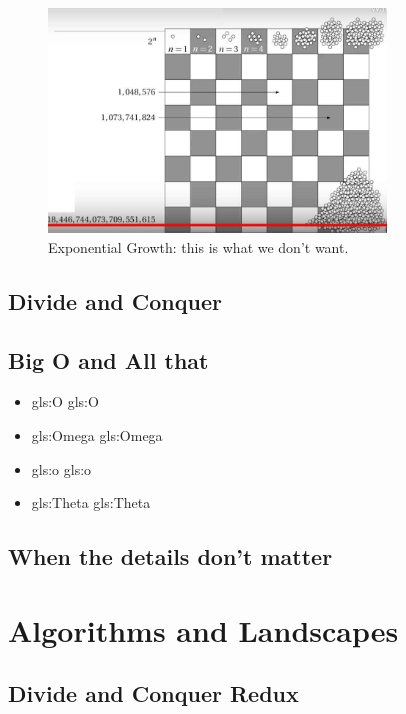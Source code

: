 \documentclass[]{article}
\begin{document}
\begin{figure}[H]
	\begin{center}
		\caption{Exponential Growth: this is what we don't want.}\label{fig:exponential}
		\includegraphics[width=0.8\textwidth]{exponential}
	\end{center}
\end{figure}
\subsection{Divide and Conquer}


\subsection{Big O and All that}

\begin{itemize}
	\item \gls{gls:O} \glsdesc{gls:O}
	\item \gls{gls:Omega} \glsdesc{gls:Omega}
	\item \gls{gls:o} \glsdesc{gls:o}
	\item \gls{gls:Theta} \glsdesc{gls:Theta}
\end{itemize}

\subsection{When the details don't matter}

\section{Algorithms and Landscapes}
\cite[Chapter 2]{moore2011nature}

\subsection{Divide and Conquer Redux}
\end{document}
